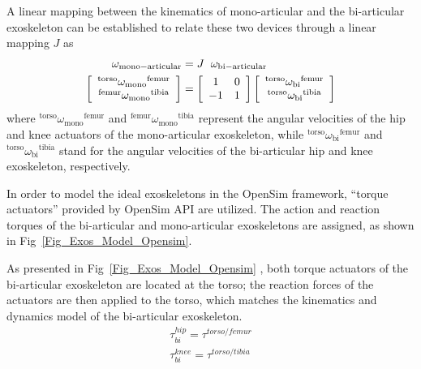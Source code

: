 \documentclass[10pt,letterpaper]{article}
\begin{document}
A linear mapping between the kinematics of mono-articular and the bi-articular exoskeleton can be established to relate these two devices through a linear mapping $J$ as
%
\begin{equation}\label{Eqn_Mono_Bi_Jacobian}
\begin{aligned}
\omega_{\mathrm{mono-articular}} &= J \hspace{2mm} \omega_{\mathrm{bi-articular}}\\
\left\lbrack \begin{array}{c}
{}^{\mathrm{torso}} {\omega_{\mathrm{mono}} }^{\mathrm{femur}} \\
{}^{\mathrm{femur}} {\omega_{\mathrm{mono}} }^{\mathrm{tibia}}
\end{array}\right\rbrack &=\left\lbrack \begin{array}{cc}
1 & 0\\
-1 & 1
\end{array}\right\rbrack \left\lbrack \begin{array}{c}
{}^{\mathrm{torso}} {\omega_{\mathrm{bi}} }^{\mathrm{femur}} \\
{}^{\mathrm{torso}} {\omega_{\mathrm{bi}} }^{\mathrm{tibia}}
\end{array}\right\rbrack
\end{aligned}
\end{equation}
%
\noindent where ${}^{\mathrm{torso}} {\omega_{\mathrm{mono}} }^{\mathrm{femur}}$ and ${}^{\mathrm{femur}} {\omega_{\mathrm{mono}} }^{\mathrm{tibia}}$ represent the angular velocities of the hip and knee actuators of the mono-articular exoskeleton, while ${}^{\mathrm{torso}} {\omega_{\mathrm{bi}} }^{\mathrm{femur}}$ and ${}^{\mathrm{torso}} {\omega_{\mathrm{bi}} }^{\mathrm{tibia}}$ stand for the angular velocities of the bi-articular hip and knee exoskeleton, respectively.



In order to model the ideal exoskeletons in the OpenSim framework, ``torque actuators'' provided by OpenSim API are utilized. The action and reaction torques of the bi-articular and mono-articular exoskeletons are assigned, as shown in Fig~\ref{Fig_Exos_Model_Opensim}.


As presented in Fig~\ref{Fig_Exos_Model_Opensim} , both torque actuators of the bi-articular exoskeleton are located at the torso; the reaction forces of the actuators are then applied to the torso, which matches the kinematics and dynamics model of the bi-articular exoskeleton.
%
\begin{eqnarray}\label{Eqn_biarticular_Torque_Act}
\tau^{hip}_{bi} = \tau^{torso/femur} \nonumber\\
\tau^{knee}_{bi} = \tau^{torso/tibia} \nonumber
\end{eqnarray}
\end{document}
